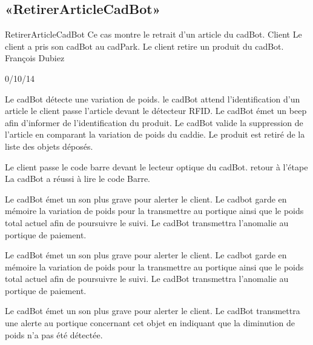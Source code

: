 \subsection{«RetirerArticleCadBot»}

\startCU
\nom RetirerArticleCadBot
\but Ce cas montre le retrait d'un article du cadBot.
\acteur Client
\precondition Le client a pris son cadBot au cadPark.
\declenchement Le client retire un produit du cadBot.
\auteur François Dubiez
\date 30/10/14

\nominal %
\startnominal
\etape Le cadBot détecte une variation de poids.
\etape le cadBot attend l'identification d'un article
 le client passe l'article devant le détecteur RFID.
\etape[RAC:SA1] Le cadBot émet un beep afin d'informer de l'identification du produit.
\etape[RAC:SA3] Le cadBot valide la suppression de l'article en comparant la variation de poids du caddie.
\stopnominal
\postcondition Le produit est retiré de la liste des objets déposés.

\alternatif %
  \etape Le client passe le code barre devant le lecteur optique du cadBot.
  \etape retour à l'étape \in[RAC:SA1]
\stopcondition
\postcondition La cadBot a réussi à lire le code Barre.
\stopalternatif

\exceptions
{}
   \etape Le cadBot émet un son plus grave pour alerter le client.
   \etape Le cadbot garde en mémoire la variation de poids pour la transmettre au portique ainsi que le poids total actuel afin de poursuivre le suivi.
\stopcondition
\postcondition Le cadBot transmettra l'anomalie au portique de paiement.
\stopalternatif

\startalternatif[RAC:SA1]
   \etape Le cadBot émet un son plus grave pour alerter le client.
   \etape Le cadbot garde en mémoire la variation de poids pour la transmettre au portique ainsi que le poids total actuel afin de poursuivre le suivi.
\stopcondition
\postcondition Le cadBot transmettra l'anomalie au portique de paiement.
\stopalternatif

\startalternatif[RAC:SA3]
   \etape Le cadBot émet un son plus grave pour alerter le client.
\stopcondition
\postcondition Le cadBot transmettra une alerte au portique concernant cet objet en indiquant que la diminution de poids n'a pas été détectée.
\stopalternatif

\stopCU
